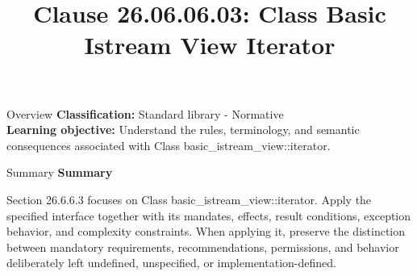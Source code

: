 \documentclass[10pt,letterpaper]{article}
\title{Clause 26.06.06.03: Class Basic Istream View Iterator}
\author{}
\date{}
\begin{document}
\maketitle
\begin{CornellOverviewBox}{Overview}
\textbf{Classification:} Standard library - Normative\\[2pt]
\textbf{Learning objective:} Understand the rules, terminology, and semantic consequences associated with Class basic\_istream\_view::iterator.
\end{CornellOverviewBox}\begin{CornellSummaryBox}{Summary}
{\sffamily\bfseries\color{Accent} Summary}\par\vspace{3pt}Section 26.6.6.3 focuses on Class basic\_istream\_view::iterator. Apply the specified interface together with its mandates, effects, result conditions, exception behavior, and complexity constraints. When applying it, preserve the distinction between mandatory requirements, recommendations, permissions, and behavior deliberately left undefined, unspecified, or implementation-defined.
\end{CornellSummaryBox}
\end{document}
